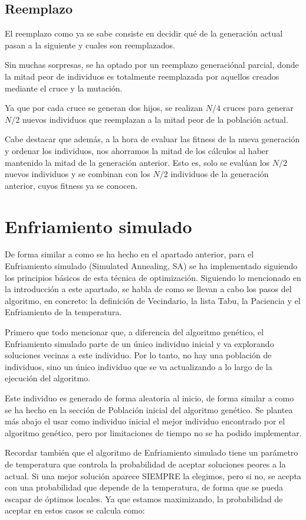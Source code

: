 \documentclass[11pt,spanish,listoffigures,listoftables]{tfgetsinf}
\begin{document}
\subsection{Reemplazo}
El reemplazo como ya se sabe consiste en decidir qué de la generación actual pasan a la siguiente y cuales son reemplazados. 

Sin muchas sorpresas, se ha optado por un reemplazo generaciónal parcial, donde la mitad peor de individuos es totalmente reemplazada por aquellos creados mediante el cruce y la mutación.

Ya que por cada cruce se generan dos hijos, se realizan $N/4$ cruces para generar $N/2$ nuevos individuos que reemplazan a la mitad peor de la población actual. 

Cabe destacar que además, a la hora de evaluar las fitness de la nueva generación y ordenar los individuos, nos ahorramos la mitad de los cálculos al haber mantenido la mitad de la generación anterior. Esto es, solo se evalúan los $N/2$ nuevos individuos y se combinan con los $N/2$ individuos de la generación anterior, cuyos fitness ya se conocen.


\section{Enfriamiento simulado}
De forma similar a como se ha hecho en el apartado anterior, para el Enfriamiento simulado (Simulated Annealing, SA) \cite{} se ha implementado siguiendo los principios básicos de esta técnica de optimización. Siguiendo lo mencionado en la introducción a este apartado, se habla de como se llevan a cabo los pasos del algoritmo, en concreto: la definición de Vecindario, la lista Tabu, la Paciencia y el Enfriamiento de la temperatura.

Primero que todo mencionar que, a diferencia del algoritmo genético, el Enfriamiento simulado parte de un único individuo inicial y va explorando soluciones vecinas a este individuo. Por lo tanto, no hay una población de individuos, sino un único individuo que se va actualizando a lo largo de la ejecución del algoritmo.

Este individuo es generado de forma aleatoria al inicio, de forma similar a como se ha hecho en la sección de Población inicial del algoritmo genético. Se plantea más abajo el usar como individuo inicial el mejor individuo encontrado por el algoritmo genético, pero por limitaciones de tiempo no se ha podido implementar.

Recordar también que el algoritmo de Enfriamiento simulado tiene un parámetro de temperatura que controla la probabilidad de aceptar soluciones peores a la actual. Si una mejor solución aparece SIEMPRE la elegimos, pero si no, se acepta con una probabilidad que depende de la temperatura, de forma que se pueda escapar de óptimos locales. Ya que estamos maximizando, la probabilidad de aceptar en estos casos se calcula como:
\end{document}
